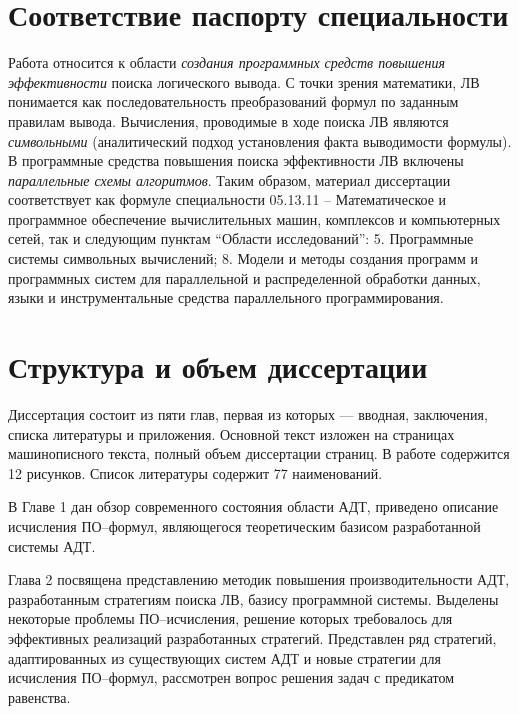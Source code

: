 \section*{Соответствие паспорту специальности}
Работа относится к области \emph{создания программных средств повышения эффективности} поиска логического вывода. С точки зрения математики, ЛВ понимается как последовательность преобразований формул по заданным правилам вывода. Вычисления, проводимые в ходе поиска ЛВ являются \emph{символьными} (аналитический подход установления факта выводимости формулы). В программные средства повышения поиска эффективности ЛВ включены \emph{параллельные схемы алгоритмов}. Таким образом, материал диссертации соответствует как формуле специальности 05.13.11 -- Математическое и программное обеспечение вычислительных машин, комплексов и компьютерных сетей, так и следующим пунктам ``Области исследований'': 5. Программные системы символьных вычислений; 
8. Модели и методы создания программ и программных систем для параллельной и распределенной обработки данных, языки и инструментальные средства параллельного программирования.



\section*{Структура и объем диссертации} 
Диссертация состоит из пяти глав, первая из которых --- вводная, заключения, списка литературы и приложения. Основной текст изложен на \pageref{pg:main} страницах машинописного текста, полный объем диссертации \pageref{pg:total} страниц. В работе содержится 12 рисунков. Список литературы содержит 77 наименований.

В Главе 1 дан обзор современного состояния области АДТ, приведено описание исчисления ПО--формул, являющегося теоретическим базисом разработанной системы АДТ. 

Глава 2 посвящена представлению методик повышения производительности АДТ, разработанным стратегиям поиска ЛВ, базису программной системы. Выделены некоторые проблемы ПО--исчисления, решение которых требовалось для эффективных реализаций разработанных стратегий. Представлен ряд стратегий, адаптированных из существующих систем АДТ и новые стратегии для исчисления ПО--формул, рассмотрен вопрос решения задач с предикатом равенства.

